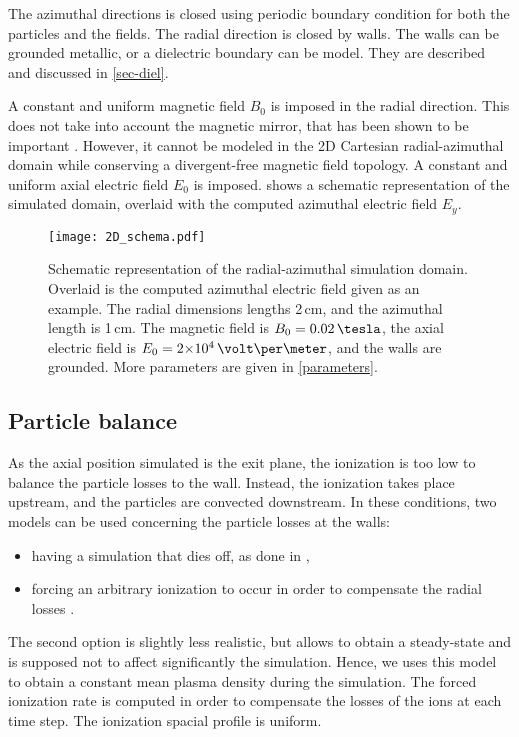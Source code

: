 The azimuthal directions is closed using periodic boundary condition for both the particles and the fields.
The radial direction is closed by walls.
The walls can be grounded metallic, or a dielectric boundary can be model.
They are described and discussed in \cref{sec-diel}.

A constant and uniform magnetic field $B_0$ is imposed in the radial direction.
This does not take into account the magnetic mirror, that has been shown to be important \citep{keidar2005,yu2008a,dominguez-vazquez2018}.
However, it cannot be modeled in the \ac{2D} Cartesian radial-azimuthal domain while conserving a divergent-free magnetic field topology.
A constant and uniform axial electric field $E_0$ is imposed.
 shows a schematic representation of the simulated domain, overlaid with the computed azimuthal electric field $E_y$.

\begin{figure}[hbtp]
  \centering
  \texttt{[image: 2D\_schema.pdf]}
  \caption{Schematic representation of the radial-azimuthal simulation domain. Overlaid is the computed azimuthal electric field given as an example. The radial dimensions lengths 2\,cm, and the azimuthal length is 1\,cm.
  The magnetic field is $B_0=0.02\,\tesla$, the axial electric field is $E_0=\sn{2}{4}\,\volt\per\meter$, and the walls are grounded. More parameters are given in \cref{parameters}.}
  \label{fig-2dschemat}
\end{figure}

\subsection{Particle balance}
As the axial position simulated is the exit plane, the ionization is too low to balance the particle losses to the wall.
Instead, the ionization takes place upstream, and the particles are convected downstream.
In these conditions, two models can be used concerning the particle losses at the walls\string:
\begin{itemize}
  \item having a simulation that dies off, as done in \citet{janhunen2018},
  \item forcing an arbitrary ionization to occur in order to compensate the radial losses \citep{dominguez-vazquez2018}.
\end{itemize}
The second option is slightly less realistic, but allows to obtain a steady-state and is supposed not to affect significantly the simulation.
Hence, we uses this model to obtain a constant mean plasma density during the simulation.
The forced ionization rate is computed in order to compensate the losses of the ions at each time step.
The ionization spacial profile is uniform.


